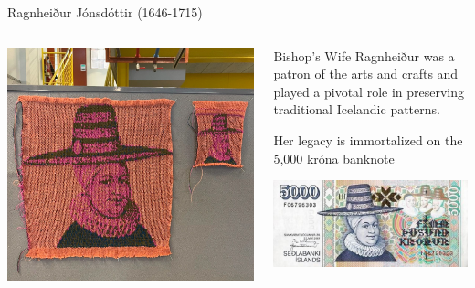 \documentclass[
    NAME={Dr. Helga Ingimundardóttir},
    EMAIL={helgaingim@hi.is},
    FACULTY={Industrial Engineering},
    TITLE={HiDef Textiles: Reviving Tradition with Innovation},
    SUBTITLE={Empowering Creativity and Sustainability in Textile Production through Digital Transformation},
    SEMINAR={Reykjavík DataBeers},
    DATE={January 25, 2025},
    WIDE={true}
]{HI-LaTeX/hi-beamer}
\begin{document}
\begin{frame}{Ragnheiður Jónsdóttir (1646-1715)}
\begin{columns}
\begin{column}{.5\linewidth}
    \includegraphics[width=\linewidth]{include/ragnheidur.png}
\end{column}    
\begin{column}{.5\linewidth}
\begin{block}{Bishop's Wife}
    Ragnheiður was a patron of the arts and crafts and played a pivotal role in preserving traditional Icelandic patterns. 
    
    Her legacy is immortalized on the 5,000 króna banknote
\end{block}
    \centering 
    \includegraphics[width=.7\linewidth]{include/5000kr.JPG}
\end{column}
\end{columns}
\end{frame}
\end{document}
